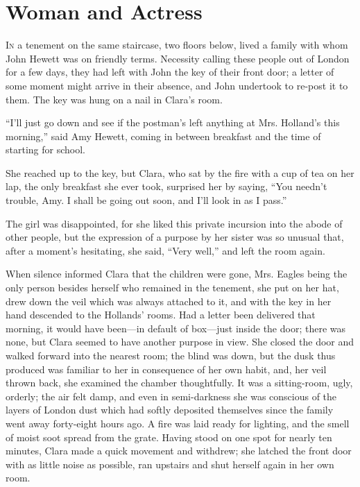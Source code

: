 \chapter{Woman and Actress}

\textsc{In} a tenement on the same staircase, two floors below, lived a
family with whom John Hewett was on friendly terms. Necessity calling
these people out of London for a few days, they had left with John the
key of their front door; a letter of some moment might arrive in their
absence, and John undertook to re-post it to them. The key was hung on a
nail in Clara's room.

``I'll just go down and see if the postman's left anything at Mrs.
Holland's this morning,'' said Amy Hewett, coming in between breakfast
and the time of starting for school.

She reached up to the key, but Clara, who sat by the fire with a cup of
tea on her lap, the only breakfast she ever took, surprised her by
saying, ``You needn't trouble, Amy. I shall be going out soon, and I'll
look in as I pass.''

{\protect\hypertarget{71}{}{}}The girl was disappointed, for she liked
this private incursion into the abode of other people, but the
expression of a purpose by her sister was so unusual that, after a
moment's hesitating, she said, ``Very well,'' and left the room again.

When silence informed Clara that the children were gone, Mrs. Eagles
being the only person besides herself who remained in the tenement, she
put on her hat, drew down the veil which was always attached to it, and
with the key in her hand descended to the Hollands' rooms. Had a letter
been delivered that morning, it would have been---in default of
box---just inside the door; there was none, but Clara seemed to have
another purpose in view. She closed the door and walked forward into the
nearest room; the blind was down, but the dusk thus produced was
familiar to her in consequence of her own habit, and, her veil thrown
back, she examined the chamber thoughtfully. It was a sitting-room,
ugly, orderly; the air felt damp, and even in semi-darkness she was
conscious of the layers of London dust which had softly deposited
themselves since the family went away forty-eight hours ago. A
{\protect\hypertarget{72}{}{}}fire was laid ready for lighting, and the
smell of moist soot spread from the grate. Having stood on one spot for
nearly ten minutes, Clara made a quick movement and withdrew; she
latched the front door with as little noise as possible, ran upstairs
and shut herself again in her own room.

